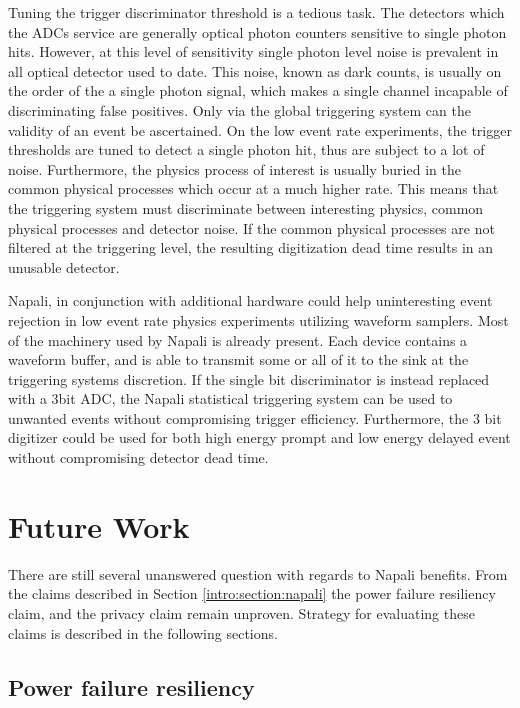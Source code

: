 Tuning the trigger discriminator threshold is a tedious task.
The detectors which the ADCs service are generally optical photon counters sensitive to single photon hits.
However, at this level of sensitivity single photon level noise is prevalent in all optical detector used to date.
This noise, known as dark counts, is usually on the order of the a single photon signal, which makes a single channel incapable of discriminating false positives.
Only via the global triggering system can the validity of an event be ascertained.
On the low event rate experiments, the trigger thresholds are tuned to detect a single photon hit, thus are subject to a lot of noise.
Furthermore, the physics process of interest is usually buried in the common physical processes which occur at a much higher rate.
This means that the triggering system must discriminate between interesting physics, common physical processes and detector noise.
If the common physical processes are not filtered at the triggering level, the resulting digitization dead time results in an unusable detector.

Napali, in conjunction with additional hardware could help uninteresting event rejection in low event rate physics experiments utilizing waveform samplers.
Most of the machinery used by Napali is already present.
Each device contains a waveform buffer, and is able to transmit some or all of it to the sink at the triggering systems discretion.
If the single bit discriminator is instead replaced with a 3bit ADC, the Napali statistical triggering system can be used to unwanted events without compromising trigger efficiency.
Furthermore, the 3 bit digitizer could be used for both high energy prompt and low energy delayed event without compromising detector dead time.


\section{Future Work}\label{sec:future-work}

There are still several unanswered question with regards to Napali benefits.
From the claims described in Section \ref{intro:section:napali} the power failure resiliency claim, and the privacy claim remain unproven.
Strategy for evaluating these claims is described in the following sections.

\subsection{Power failure resiliency}\label{subsec:power-failure-resiliancy}

